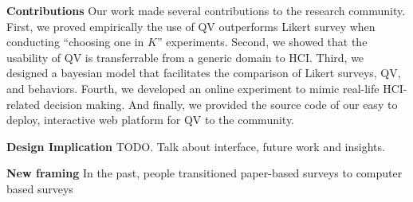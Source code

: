 \textbf{Contributions}
Our work made several contributions to the research community. 
First, we proved empirically 
the use of QV outperforms Likert survey
when conducting ``choosing one in $K$'' experiments.
Second, we showed that the usability of QV
is transferrable from a generic domain to HCI.
Third, we designed a bayesian model 
that facilitates the comparison
of Likert surveys, QV, and behaviors.
Fourth, we developed an online experiment
to mimic real-life HCI-related decision making.
And finally, we provided the source code of our easy to deploy, 
interactive web platform for QV to the community.

\textbf{Design Implication}
TODO. Talk about interface, future work and insights.

\textbf{New framing}
In the past, 
people transitioned paper-based surveys to computer based surveys